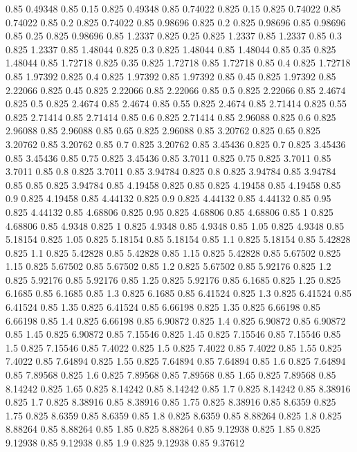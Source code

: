 0.85 0.49348
0.85 0.15
0.825 0.49348
0.85 0.74022
0.825 0.15
0.825 0.74022
0.85 0.74022
0.85 0.2
0.825 0.74022
0.85 0.98696
0.825 0.2
0.825 0.98696
0.85 0.98696
0.85 0.25
0.825 0.98696
0.85 1.2337
0.825 0.25
0.825 1.2337
0.85 1.2337
0.85 0.3
0.825 1.2337
0.85 1.48044
0.825 0.3
0.825 1.48044
0.85 1.48044
0.85 0.35
0.825 1.48044
0.85 1.72718
0.825 0.35
0.825 1.72718
0.85 1.72718
0.85 0.4
0.825 1.72718
0.85 1.97392
0.825 0.4
0.825 1.97392
0.85 1.97392
0.85 0.45
0.825 1.97392
0.85 2.22066
0.825 0.45
0.825 2.22066
0.85 2.22066
0.85 0.5
0.825 2.22066
0.85 2.4674
0.825 0.5
0.825 2.4674
0.85 2.4674
0.85 0.55
0.825 2.4674
0.85 2.71414
0.825 0.55
0.825 2.71414
0.85 2.71414
0.85 0.6
0.825 2.71414
0.85 2.96088
0.825 0.6
0.825 2.96088
0.85 2.96088
0.85 0.65
0.825 2.96088
0.85 3.20762
0.825 0.65
0.825 3.20762
0.85 3.20762
0.85 0.7
0.825 3.20762
0.85 3.45436
0.825 0.7
0.825 3.45436
0.85 3.45436
0.85 0.75
0.825 3.45436
0.85 3.7011
0.825 0.75
0.825 3.7011
0.85 3.7011
0.85 0.8
0.825 3.7011
0.85 3.94784
0.825 0.8
0.825 3.94784
0.85 3.94784
0.85 0.85
0.825 3.94784
0.85 4.19458
0.825 0.85
0.825 4.19458
0.85 4.19458
0.85 0.9
0.825 4.19458
0.85 4.44132
0.825 0.9
0.825 4.44132
0.85 4.44132
0.85 0.95
0.825 4.44132
0.85 4.68806
0.825 0.95
0.825 4.68806
0.85 4.68806
0.85 1
0.825 4.68806
0.85 4.9348
0.825 1
0.825 4.9348
0.85 4.9348
0.85 1.05
0.825 4.9348
0.85 5.18154
0.825 1.05
0.825 5.18154
0.85 5.18154
0.85 1.1
0.825 5.18154
0.85 5.42828
0.825 1.1
0.825 5.42828
0.85 5.42828
0.85 1.15
0.825 5.42828
0.85 5.67502
0.825 1.15
0.825 5.67502
0.85 5.67502
0.85 1.2
0.825 5.67502
0.85 5.92176
0.825 1.2
0.825 5.92176
0.85 5.92176
0.85 1.25
0.825 5.92176
0.85 6.1685
0.825 1.25
0.825 6.1685
0.85 6.1685
0.85 1.3
0.825 6.1685
0.85 6.41524
0.825 1.3
0.825 6.41524
0.85 6.41524
0.85 1.35
0.825 6.41524
0.85 6.66198
0.825 1.35
0.825 6.66198
0.85 6.66198
0.85 1.4
0.825 6.66198
0.85 6.90872
0.825 1.4
0.825 6.90872
0.85 6.90872
0.85 1.45
0.825 6.90872
0.85 7.15546
0.825 1.45
0.825 7.15546
0.85 7.15546
0.85 1.5
0.825 7.15546
0.85 7.4022
0.825 1.5
0.825 7.4022
0.85 7.4022
0.85 1.55
0.825 7.4022
0.85 7.64894
0.825 1.55
0.825 7.64894
0.85 7.64894
0.85 1.6
0.825 7.64894
0.85 7.89568
0.825 1.6
0.825 7.89568
0.85 7.89568
0.85 1.65
0.825 7.89568
0.85 8.14242
0.825 1.65
0.825 8.14242
0.85 8.14242
0.85 1.7
0.825 8.14242
0.85 8.38916
0.825 1.7
0.825 8.38916
0.85 8.38916
0.85 1.75
0.825 8.38916
0.85 8.6359
0.825 1.75
0.825 8.6359
0.85 8.6359
0.85 1.8
0.825 8.6359
0.85 8.88264
0.825 1.8
0.825 8.88264
0.85 8.88264
0.85 1.85
0.825 8.88264
0.85 9.12938
0.825 1.85
0.825 9.12938
0.85 9.12938
0.85 1.9
0.825 9.12938
0.85 9.37612
